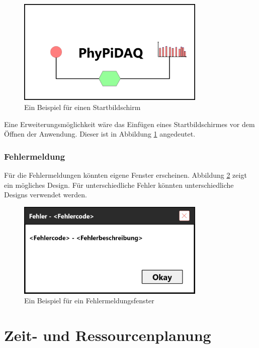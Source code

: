 \documentclass[parskip=full]{scrartcl}
\begin{document}
\begin{figure}[htbp]
	\begin{center}
		\includegraphics[width = 9cm]{Grafik/Startbildschirm.png}
		\caption{Ein Beispiel für einen Startbildschirm}
		\label{startbildschirm}
	\end{center}
\end{figure}

Eine Erweiterungsmöglichkeit wäre das Einfügen eines Startbildschirmes vor dem Öffnen der Anwendung. Dieser ist in Abbildung \ref{startbildschirm} angedeutet.

\subsubsection{Fehlermeldung}

Für die Fehlermeldungen könnten eigene Fenster erscheinen. Abbildung \ref{fehlerfenster} zeigt ein mögliches Design. Für unterschiedliche Fehler könnten unterschiedliche Designs verwendet werden.

\begin{figure}[htbp]
	\begin{center}
		\includegraphics[width = 9cm]{Grafik/Fehlerfenster}
		\caption{Ein Beispiel für ein Fehlermeldungsfenster}
		\label{fehlerfenster}
	\end{center}
\end{figure}

\clearpage
\section{Zeit- und Ressourcenplanung}\label{zeit}
\end{document}
